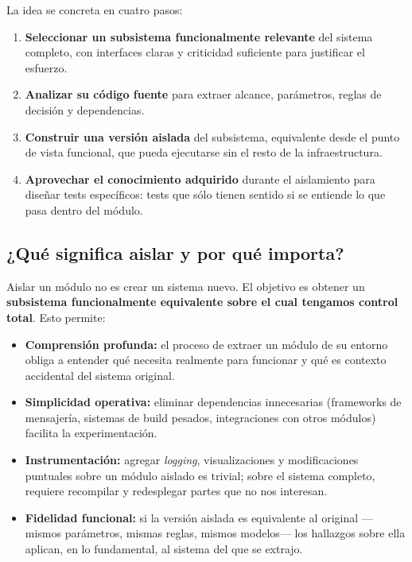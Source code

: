 La idea se concreta en cuatro pasos:

\begin{enumerate}
    \item \textbf{Seleccionar un subsistema funcionalmente relevante} del sistema completo, con interfaces claras y criticidad suficiente para justificar el esfuerzo.

    \item \textbf{Analizar su código fuente} para extraer alcance, parámetros, reglas de decisión y dependencias.

    \item \textbf{Construir una versión aislada} del subsistema, equivalente desde el punto de vista funcional, que pueda ejecutarse sin el resto de la infraestructura.

    \item \textbf{Aprovechar el conocimiento adquirido} durante el aislamiento para diseñar tests específicos: tests que sólo tienen sentido si se entiende lo que pasa dentro del módulo.
\end{enumerate}

\subsection{¿Qué significa aislar y por qué importa?}

Aislar un módulo no es crear un sistema nuevo. El objetivo es obtener un \textbf{subsistema funcionalmente equivalente sobre el cual tengamos control total}. Esto permite:

\begin{itemize}
    \item \textbf{Comprensión profunda:} el proceso de extraer un módulo de su entorno obliga a entender qué necesita realmente para funcionar y qué es contexto accidental del sistema original.

    \item \textbf{Simplicidad operativa:} eliminar dependencias innecesarias (frameworks de mensajería, sistemas de build pesados, integraciones con otros módulos) facilita la experimentación.

    \item \textbf{Instrumentación:} agregar \textit{logging}, visualizaciones y modificaciones puntuales sobre un módulo aislado es trivial; sobre el sistema completo, requiere recompilar y redesplegar partes que no nos interesan.

    \item \textbf{Fidelidad funcional:} si la versión aislada es equivalente al original ---mismos parámetros, mismas reglas, mismos modelos--- los hallazgos sobre ella aplican, en lo fundamental, al sistema del que se extrajo.
\end{itemize}

